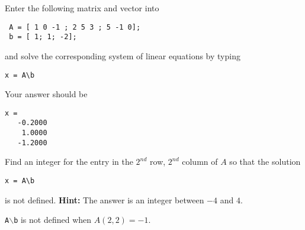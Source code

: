 \documentclass{ximera}
\begin{document}
\begin{exercise} \label{c2.1.5}
Enter the following matrix and vector into \Matlab
\begin{verbatim}
 A = [ 1 0 -1 ; 2 5 3 ; 5 -1 0];
 b = [ 1; 1; -2];
\end{verbatim}
and solve the corresponding system of linear equations by typing
\begin{verbatim}
x = A\b
\end{verbatim}
Your answer should be
\begin{verbatim}
x =
   -0.2000
    1.0000
   -1.2000
\end{verbatim}
Find an integer for the entry in the $2^{nd}$ row, $2^{nd}$ column
of $A$ so that the solution
\begin{verbatim}
x = A\b
\end{verbatim}
is not defined.  {\bf Hint:} The answer is an integer between
$-4$ and $4$.

\begin{solution}

{\tt A}$\backslash${\tt b} is not defined when $A(2,2) = -1$.

\end{solution}
\end{exercise}
\end{document}
